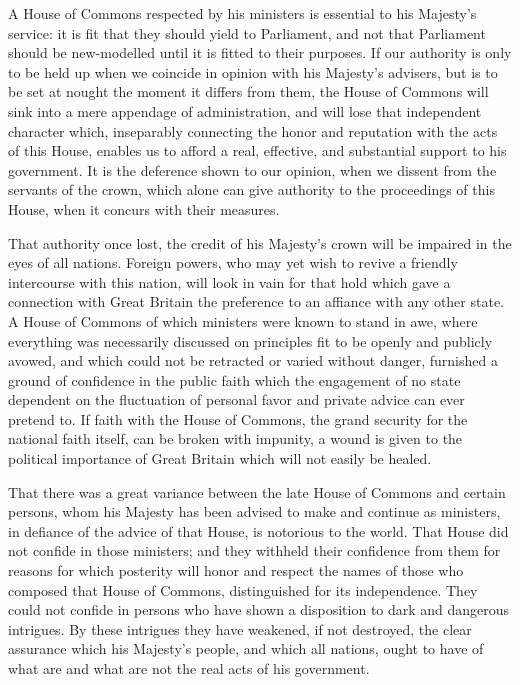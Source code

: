 A House of Commons respected by his ministers is essential to his Majesty's service: it is fit that they should yield to Parliament, and not that Parliament should be new-modelled until it is fitted to their purposes. If our authority is only to be held up when we coincide in opinion with his Majesty's advisers, but is to be set at nought the moment it differs from them, the House of Commons will sink into a mere appendage of administration, and will lose that independent character which, inseparably connecting the honor and reputation with the acts of this House, enables us to afford a real, effective, and substantial support to his government. It is the deference shown to our opinion, when we dissent from the servants of the crown, which alone can give authority to the proceedings of this House, when it concurs with their measures.

That authority once lost, the credit of his Majesty's crown will be impaired in the eyes of all nations. Foreign powers, who may yet wish to revive a friendly intercourse with this nation, will look in vain for that hold which gave a connection with Great Britain the preference to an affiance with any other state. A House of Commons of which ministers were known to stand in awe, where everything was necessarily discussed on principles fit to be openly and publicly avowed, and which could not be retracted or varied without danger, furnished a ground of confidence in the public faith which the engagement of no state dependent on the fluctuation of personal favor and private advice can ever pretend to. If faith with the House of Commons, the grand security for the national faith itself, can be broken with impunity, a wound is given to the political importance of Great Britain which will not easily be healed.

That there was a great variance between the late House of Commons and certain persons, whom his Majesty has been advised to make and continue as ministers, in defiance of the advice of that House, is notorious to the world. That House did not confide in those ministers; and they withheld their confidence from them for reasons for which posterity will honor and respect the names of those who composed that House of Commons, distinguished for its independence. They could not confide in persons who have shown a disposition to dark and dangerous intrigues. By these intrigues they have weakened, if not destroyed, the clear assurance which his Majesty's people, and which all nations, ought to have of what are and what are not the real acts of his government.


